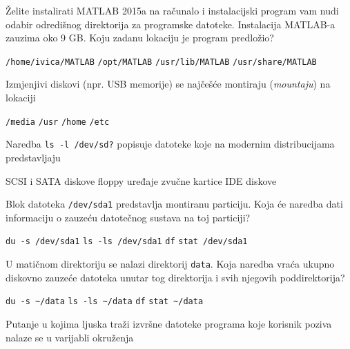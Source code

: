 \documentclass[a4paper,11pt]{exam}
\newcommand{\shell}[1]{\texttt{#1}}
\begin{document}
\begin{questions}
	\question
	Želite instalirati MATLAB 2015a na računalo i instalacijski program vam nudi odabir odredišnog direktorija za programske datoteke. Instalacija MATLAB-a zauzima oko 9 GB. Koju zadanu lokaciju je program predložio?
	
	\begin{oneparchoices}
		\choice \shell{/home/ivica/MATLAB} 
		\CorrectChoice \shell{/opt/MATLAB} 
		\choice \shell{/usr/lib/MATLAB} 
		\choice \shell{/usr/share/MATLAB} 
	\end{oneparchoices}
	
	\question
	Izmjenjivi diskovi (npr. USB memorije) se najčešće montiraju (\textit{mountaju}) na lokaciji
	
	\begin{oneparchoices}
		\CorrectChoice \shell{/media}
		\choice \shell{/usr}
		\choice \shell{/home}
		\choice \shell{/etc} 
	\end{oneparchoices}

	\question
	Naredba \shell{ls -l /dev/sd?} popisuje datoteke koje na modernim distribucijama predstavljaju
	
	\begin{oneparchoices}
		\CorrectChoice SCSI i SATA diskove 
		\choice floppy uređaje 
		\choice zvučne kartice 
		\choice IDE diskove
	\end{oneparchoices}

	\question
	Blok datoteka \shell{/dev/sda1} predstavlja montiranu particiju. Koja će naredba dati informaciju o zauzeću datotečnog sustava na toj particiji?
	
	\begin{oneparchoices}
		\choice \shell{du -s /dev/sda1}
		\choice \shell{ls -ls /dev/sda1}
		\CorrectChoice \shell{df}
		\choice \shell{stat /dev/sda1}
	\end{oneparchoices}
	
	\question
	U matičnom direktoriju se nalazi direktorij \shell{data}. Koja naredba vraća ukupno diskovno zauzeće datoteka unutar tog direktorija i svih njegovih poddirektorija?
	
	\begin{oneparchoices}
		\CorrectChoice \shell{du -s \textasciitilde/data}
		\choice \shell{ls -ls \textasciitilde/data}
		\choice \shell{df}
		\choice \shell{stat \textasciitilde/data}
	\end{oneparchoices}
	
	\question
	Putanje u kojima ljuska traži izvršne datoteke programa koje korisnik poziva nalaze se u varijabli okruženja
	

\end{questions}
\end{document}
